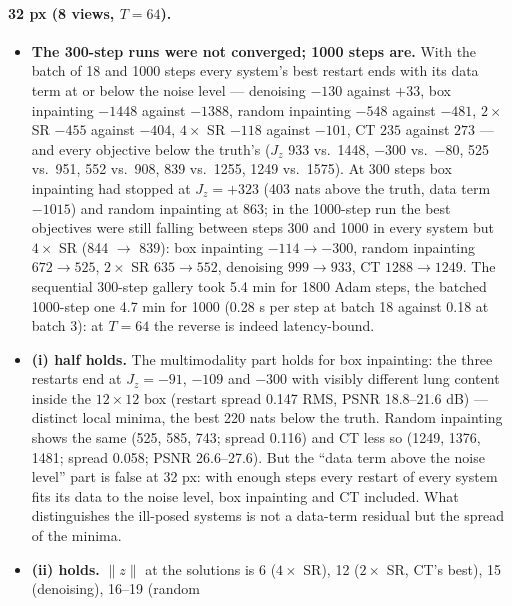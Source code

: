 \documentclass[11pt]{article}
\begin{document}
\paragraph{32 px (8 views, $T = 64$).}
\begin{itemize}
  \item \textbf{The 300-step runs were not converged; 1000 steps are.} With
        the batch of 18 and 1000 steps every system's best restart ends with
        its data term at or below the noise level --- denoising $-130$
        against $+33$, box inpainting $-1448$ against $-1388$, random
        inpainting $-548$ against $-481$, $2\times$ SR $-455$ against
        $-404$, $4\times$ SR $-118$ against $-101$, CT $235$ against $273$
        --- and every objective below the truth's ($J_z$ 933 vs.\ 1448,
        $-300$ vs.\ $-80$, 525 vs.\ 951, 552 vs.\ 908, 839 vs.\ 1255, 1249
        vs.\ 1575). At 300 steps box inpainting had stopped at $J_z = +323$
        (403 nats above the truth, data term $-1015$) and random inpainting
        at 863; in the 1000-step run the best objectives were still falling
        between steps 300 and 1000 in every system but $4\times$ SR (844
        $\to$ 839): box inpainting $-114 \to -300$, random inpainting $672
        \to 525$, $2\times$ SR $635 \to 552$, denoising $999 \to 933$, CT
        $1288 \to 1249$. The sequential
        300-step gallery took 5.4 min for 1800 Adam steps, the batched
        1000-step one 4.7 min for 1000 (0.28 s per step at batch 18 against
        0.18 at batch 3): at $T = 64$ the reverse is indeed latency-bound.
  \item \textbf{(i) half holds.} The multimodality part holds for box
        inpainting: the three restarts end at $J_z = -91$, $-109$ and $-300$
        with visibly different lung content inside the $12 \times 12$ box
        (restart spread 0.147 RMS, PSNR 18.8--21.6 dB) --- distinct local
        minima, the best 220 nats below the truth. Random inpainting shows
        the same (525, 585, 743; spread 0.116) and CT less so (1249, 1376,
        1481; spread 0.058; PSNR 26.6--27.6). But the ``data term above the
        noise level'' part is false at 32 px: with enough steps every
        restart of every system fits its data to the noise level, box
        inpainting and CT included. What distinguishes the ill-posed systems
        is not a data-term residual but the spread of the minima.
  \item \textbf{(ii) holds.} $\|z\|$ at the solutions is 6 ($4\times$ SR),
        12 ($2\times$ SR, CT's best), 15 (denoising), 16--19 (random

\end{itemize}
\end{document}
